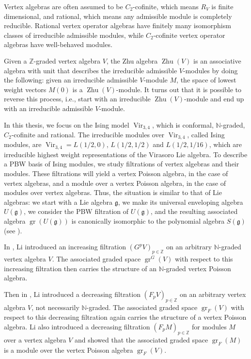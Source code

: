 \documentclass[a4paper, 12pt, reqno]{amsart}
\theoremstyle{remark}
\DeclareMathOperator{\Vir}{Vir}
\DeclareMathOperator{\gr}{gr}
\DeclareMathOperator{\Zhu}{Zhu}
\begin{document}
Vertex algebras are often assumed to be $C_2$-cofinite, which means $R_V$ is finite dimensional, and rational, which means any admissible module is completely reducible.
Rational vertex operator algebras have finitely many isomorphism classes of irreducible admissible modules, while $C_2$-cofinite vertex operator algebras have well-behaved modules.

Given a $\mathbb{Z}$-graded vertex algebra $V$, the Zhu algebra $\Zhu(V)$ is an associative algebra with unit that describes the irreducible admissible $V$-modules by doing the following: given an irreducible admissible $V$-module $M$, the space of lowest weight vectors $M(0)$ is a $\Zhu(V)$-module.
It turns out that it is possible to reverse this process, i.e., start with an irreducible $\Zhu(V)$-module and end up with an irreducible admissible $V$-module.

In this thesis, we focus on the Ising model $\Vir_{3, 4}$, which is conformal, $\mathbb{N}$-graded, $C_2$-cofinite and rational.
The irreducible modules over $\Vir_{3, 4}$, called Ising modules, are $\Vir_{3, 4} = L(1/2, 0)$, $L(1/2, 1/2)$ and $L(1/2, 1/16)$, which are irreducible highest weight representations of the Virasoro Lie algebra.
To describe a PBW basis of Ising modules, we study filtrations of vertex algebras and their modules.
These filtrations will yield a vertex Poisson algebra, in the case of vertex algebras, and a module over a vertex Poisson algebra, in the case of modules over vertex algebras.
Thus, the situation is similar to that of Lie algebras: we start with a Lie algebra $\mathfrak{g}$, we make its universal enveloping algebra $U(\mathfrak{g})$, we consider the PBW filtration of $U(\mathfrak{g})$, and the resulting associated algebra $\gr(U(\mathfrak{g}))$ is canonically isomorphic to the polynomial algebra $S(\mathfrak{g})$ (see ).

In \cite{li_vertex_2004}, Li introduced an increasing filtration $(G^pV)_{p \in \mathbb{Z}}$ on an arbitrary $\mathbb{N}$-graded vertex algebra $V$.
The associated graded space $\gr^G(V)$ with respect to this increasing filtration then carries the structure of an $\mathbb{N}$-graded vertex Poisson algebra.

Then in \cite{li_abelianizing_2005}, Li introduced a decreasing filtration $(F_pV)_{p \in \mathbb{Z}}$ on an arbitrary vertex algebra $V$, not necessarily $\mathbb{N}$-graded.
The associated graded space $\gr_F(V)$ with respect to this decreasing filtration again carries the structure of a vertex Poisson algebra.
Li also introduced a decreasing filtration $(F_pM)_{p \in \mathbb{Z}}$ for modules $M$ over a vertex algebra $V$ and showed that the associated graded space $\gr_F(M)$ is a module over the vertex Poisson algebra $\gr_F(V)$.
\end{document}
